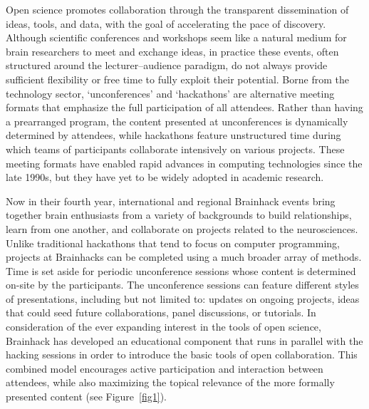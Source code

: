 \documentclass[11pt]{bmc_article_s50}
\begin{document}
Open science promotes collaboration through the transparent dissemination of ideas, tools, and data, with the goal of accelerating the pace of discovery. Although scientific conferences and workshops seem like a natural medium for brain researchers to meet and exchange ideas, in practice these events, often structured around the lecturer--audience paradigm, do not always provide sufficient flexibility or free time to fully exploit their potential. Borne from the technology sector, `unconferences' and `hackathons' are alternative meeting formats that emphasize the full participation of all attendees. Rather than having a prearranged program, the content presented at unconferences is dynamically determined by attendees, 
while hackathons feature unstructured time during which teams of participants collaborate intensively on various projects. These meeting formats have enabled rapid advances in computing technologies since the late 1990s, but they have yet to be widely adopted in academic research. 


Now in their fourth year, international and regional Brainhack events bring together brain enthusiasts from a variety of backgrounds to build relationships, learn from one another, and collaborate on projects related to the neurosciences. Unlike traditional hackathons that tend to focus on computer programming, projects at Brainhacks can be completed using a much broader array of methods. Time is set aside for periodic unconference sessions whose content is determined on-site by the participants. The unconference sessions can feature different styles of presentations, including but not limited to: updates on ongoing projects, ideas that could seed future collaborations, panel discussions, or tutorials. In consideration of the ever expanding interest in the tools of open science, Brainhack has developed an educational component that runs in parallel %
with the hacking sessions in order to introduce the basic tools of open collaboration. This combined model encourages active participation and interaction between attendees, while also maximizing the topical relevance of the more formally presented content (see Figure~\ref{fig1}).
\end{document}
